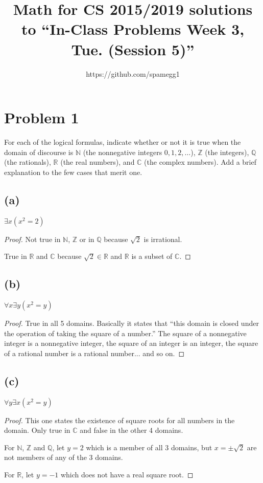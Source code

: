 \documentclass[14pt]{extarticle}
\title{Math for CS 2015/2019 solutions to ``In-Class Problems Week 3, Tue. (Session 5)''}
\author{https://github.com/spamegg1}
\begin{document}
\maketitle
\tableofcontents

\section{Problem 1}
For each of the logical formulas, indicate whether or not it is true when the domain of discourse is $\mathbb{N}$ (the nonnegative integers $0, 1, 2, \ldots$), $\mathbb{Z}$ (the integers), $\mathbb{Q}$ (the rationals), $\mathbb{R}$ (the real numbers), and $\mathbb{C}$ (the complex numbers). Add a brief explanation to the few cases that merit one.

\subsection{(a)}
$\exists x(x^2 = 2)$ 
\begin{proof}
Not true in $\mathbb{N}$, $\mathbb{Z}$ or in $\mathbb{Q}$ because $\sqrt{2}$ is irrational.

True in $\mathbb{R}$ and $\mathbb{C}$ because $\sqrt{2} \in \mathbb{R}$ and $\mathbb{R}$ is a subset of $\mathbb{C}$.
\end{proof}

\subsection{(b)}
$\forall x \exists y (x^2 = y)$
\begin{proof}
True in all 5 domains. Basically it states that ``this domain is closed under the operation of taking the square of a number.'' The square of a nonnegative integer is a nonnegative integer, the square of an integer is an integer, the square of a rational number is a rational number... and so on.
\end{proof}

\subsection{(c)}
$\forall y \exists x (x^2 = y)$
\begin{proof}
This one states the existence of square roots for all numbers in the domain. Only true in $\mathbb{C}$ and false in the other 4 domains. 

For $\mathbb{N}$, $\mathbb{Z}$ and $\mathbb{Q}$, let $y = 2$ which is a member of all 3 domains, but $x = \pm \sqrt{2}$ are not members of any of the 3 domains.

For $\mathbb{R}$, let $y = -1$ which does not have a real square root.
\end{proof}
\end{document}
